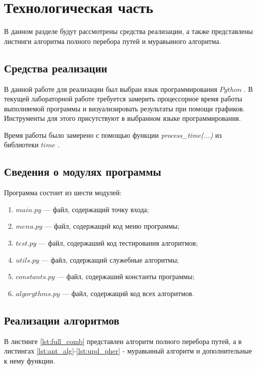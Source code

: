 \chapter{Технологическая часть}

В данном разделе будут рассмотрены средства реализации, а также представлены листинги алгоритма полного перебора путей и муравьиного алгоритма.

\section{Средства реализации}
В данной работе для реализации был выбран язык программирования $Python$ \cite{python-lang}. В текущей лабораторной работе требуется замерить процессорное время работы выполняемой программы
и визуализировать результаты при помощи графиков. Инструменты для этого присутствуют в выбранном языке программирования.

Время работы было замерено с помощью функции \textit{process\_time(...)} из библиотеки $time$ \cite{python-lang-time}.

\section{Сведения о модулях программы}
Программа состоит из шести модулей:
\begin{enumerate}[label=\arabic*)]
	\item $main.py$ --- файл, содержащий точку входа;
	\item $menu.py$ --- файл, содержащий код меню программы;
	\item $test.py$ --- файл, содержаший код тестирования алгоритмов;
	\item $utils.py$ --- файл, содержащий служебные алгоритмы;
	\item $constants.py$ --- файл, содержаший константы программы;
	\item $algorythms.py$ --- файл, содержащий код всех алгоритмов. 
\end{enumerate}


\section{Реализации алгоритмов}

В листинге \ref{lst:full_comb} представлен алгоритм полного перебора путей, а в листингах \ref{lst:ant_alg}-\ref{lst:upd_pher} - муравьиный алгоритм и дополнительные к нему функции.

\clearpage

